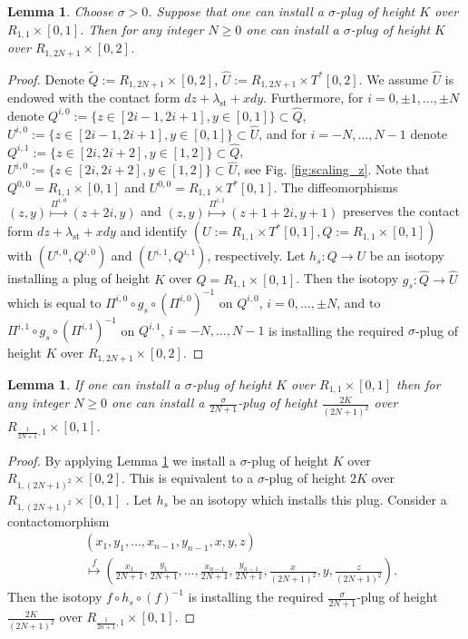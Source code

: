\documentclass[12pt]{amsart}
\theoremstyle{plain}
\newtheorem{lemma}[theorem]{Lemma}
\theoremstyle{definition}
\theoremstyle{remark}
\newcommand{\wt}{\widetilde}
\newcommand{\wh}{\widehat}
\newcommand{\st}{\mathrm{st}}
\begin{document}
  
  
  
  
  
  
  
  
  
  
\begin{lemma}\label{lm:enlarging-height}
Choose    $\sigma>0$.  Suppose that one can install a $\sigma$-plug of height $K$  over  $R_{1,1}\times [0,1]$. Then  for any integer $N\geq 0$ one can install a $\sigma$-plug  of height $ K$    over $R_{1,2N+1}\times[0,2]$.
\end{lemma}

 
\begin{proof} Denote   $\wt Q:= R_{1,2N+1}\times[0,2]$, $\wh U:=R_{1,2N+1}\times T^*[0,2]$. We assume $\wh U$ is endowed with the contact form $dz+\lambda_\st+xdy$.
Furthermore,  for $i=0,\pm 1,\dots, \pm N$ denote $ Q^{i,0}:=\{z\in[2i-1 ,2i+1], y\in[0,1]\}\subset \wh Q$, $  U^{i,0}:=\{z\in[2i-1,2i+1], y\in[0,1]\}\subset \wh U$,   and  for $i=-N,\dots, N-1$  denote
  $  Q^{i,1}:=\{z\in[2i,2i+2], y\in[1,2]\}\subset \wh Q$,  $  U^{i,0}:=\{z\in[2i,2i+2], y\in[1,2]\}\subset \wh U$, see Fig. \ref{fig:scaling_z}.   Note that $Q^{0,0}=R_{1,1}\times [0,1]$   and  $U^{0,0} =R_{1,1}  \times T^*[0,1]$. The  diffeomorphisms  $(z,y)\mathop{\mapsto}\limits^{\Pi^{i,0}} (z+2i,y)$ and $(z,y)\mathop{\mapsto}\limits^{\Pi^{i,1}} (z+1+2i,y+1)$    preserves the contact form $dz+\lambda_\st+xdy$ and identify
$ (U:=R_{1,1}  \times T^*[0,1], Q:= R_{1,1}\times [0,1])$ with $(U^{i,0}, Q^{i,0})$ and $(U^{i,1}, Q^{i,1})$, respectively.  Let $h_s:Q\to U$ be an isotopy installing a plug  of height $K$
over $Q=R_{1,1}\times [0,1]$. Then the isotopy  $g_s:\wh Q\to\wh U$  which is equal to $\Pi^{i,0}\circ g_s\circ(\Pi^{i,0})^{-1} $ on $Q^{i,0}$, $i=0,\dots, \pm N$,  and to $\Pi^{i,1}\circ g_s\circ(\Pi^{i,1})^{-1} $ on $Q^{i,1}$, $i=-N,\dots, N-1$ is installing the required  $\sigma$-plug  of height $ K$   over $R_{1,2N+1}\times[0,2]$.
\end{proof}

\begin{lemma} \label{lm:scaling-plug}
 If one can install a $\sigma$-plug of height $ K $  over $ R_{1,1}\times[0,1]$ then  for any integer $N\geq 0$ one can install a $\frac\sigma {2N+1}$-plug  of height $ \frac{2K}{(2N+1)^2}$    over $R_{\frac1{2N+1},1}\times[0,1]$. 
\end{lemma}
\begin{proof} By applying Lemma \ref{lm:enlarging-height} we install a $\sigma$-plug  of height $ K$   over $R_{1,(2N+1)^2}\times[0,2]$. This is equivalent to a   $\sigma$-plug  of height $ 2K$   over $R_{1,(2N+1)^2}\times[0,1]$ . Let $h_s$  be an isotopy  which installs this plug. Consider a contactomorphism
\begin{align*}
&(x_1, y_1,\dots, x_{n-1}, y_{n-1},  x,y,z)\\
&\mathop{\mapsto}\limits^f  \left(\frac{x_1}{2N+1}, \frac{y_1}{2N+1},\dots,\frac{ x_{n-1}}{2N+1}, \frac{y_{n-1}}{2N+1}, \frac{x}{(2N+1)^2},y, \frac{z}{(2N+1)^2}\right).
\end{align*} Then the isotopy $f\circ h_s\circ (f)^{-1}$ is  installing the required   $\frac\sigma {2N+1}$-plug  of height $ \frac{2K}{(2N+1)^2}$    over $R_{\frac1{2n+1},1}\times[0,1]$. 
\end{proof}
 
\end{document}

